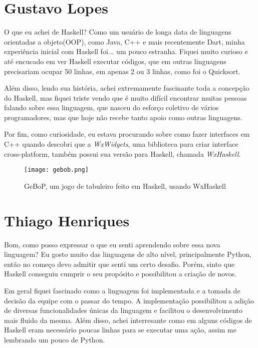 \begin{apendicesenv}
      
    \partapendices

    \setcounter{chapter}{0}
    \renewcommand{\thechapter}{\Alph{chapter}}%

    \chapter{Gustavo Lopes}

    O que eu achei de Haskell? Como um usuário de longa data de linguagens orientadas a objeto(OOP), 
    como Java, C++ e mais recentemente Dart, minha experiência inicial com Haskell foi...
    um pouco estranha. Fiquei muito curioso e até encucado em ver Haskell executar códigos, que em
    outras linguagens precisariam ocupar 50 linhas, em apenas 2 ou 3 linhas, como foi o Quicksort.

    Além disso, lendo sua história, achei extremamente fascinante toda a concepção do Haskell,
    mas fiquei triste vendo que é muito difícil encontrar muitas pessoas falando sobre essa linguagem, que nasceu 
    do esforço coletivo de vários programadores, mas que hoje não recebe tanto apoio como outras linguagens.

    Por fim, como curiosidade, eu estava procurando sobre como fazer interfaces em C++ quando
    descobri que a \emph{WxWidgets}, uma biblioteca para criar interface cross-platform, também possui 
    sua versão para Haskell, chamada \emph{WxHaskell}.

    \begin{figure}[ht]
      \texttt{[image: gebob.png]}
      \caption{GeBoP, um jogo de tabuleiro feito em Haskell, usando WxHaskell}
    \end{figure}

    \newpage

    \chapter{Thiago Henriques}
    
    Bom, como posso expressar o que eu senti aprendendo sobre essa nova linguagem? Eu gosto muito das linguagens de alto nível, principalmente Python,
    então no começo devo admitir que senti um certo desafio. Porém, sinto que Haskell conseguiu cumprir o 
    seu propósito e possibilitou a criação de novos.

    Em geral fiquei fascinado como a linguagem foi implementada e a tomada de decisão da equipe com o passar do tempo. A implementação
    possibilitou a adição de diversas funcionalidades únicas da linguagem e facilitou o desenvolvimento mais fluido da mesma.
    Além disso, achei interresante como em alguns códigos de Haskell eram necessário poucas linhas para se executar uma ação, assim
    me lembrando um pouco de Python.


\end{apendicesenv}
